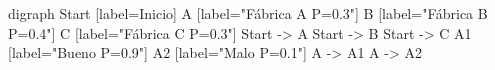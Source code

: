 digraph {
	Start [label=Inicio]
	A [label="Fábrica A
P=0.3"]
	B [label="Fábrica B
P=0.4"]
	C [label="Fábrica C
P=0.3"]
	Start -> A
	Start -> B
	Start -> C
	A1 [label="Bueno
P=0.9"]
	A2 [label="Malo
P=0.1"]
	A -> A1
	A -> A2
}
